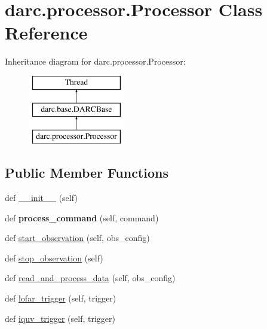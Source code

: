 \hypertarget{classdarc_1_1processor_1_1_processor}{}\section{darc.\+processor.\+Processor Class Reference}
\label{classdarc_1_1processor_1_1_processor}
Inheritance diagram for darc.\+processor.\+Processor\+:\begin{figure}[H]
\begin{center}
\leavevmode
\includegraphics[height=3.000000cm]{classdarc_1_1processor_1_1_processor}
\end{center}
\end{figure}
\subsection*{Public Member Functions}
\begin{DoxyCompactItemize}
\item 
def \mbox{\hyperlink{classdarc_1_1processor_1_1_processor_a82610338505fd26f2489149ed62ca282}{\+\_\+\+\_\+init\+\_\+\+\_\+}} (self)
\item 
\mbox{\label{classdarc_1_1processor_1_1_processor_a89f2c721c75b497f0fe68f697c7ffa6d}} 
def {\bfseries process\+\_\+command} (self, command)
\item 
def \mbox{\hyperlink{classdarc_1_1processor_1_1_processor_a7428244f0d8b3676db245655a802b86c}{start\+\_\+observation}} (self, obs\+\_\+config)
\item 
def \mbox{\hyperlink{classdarc_1_1processor_1_1_processor_a52192a97b32019ab29c2c1baf1599d2c}{stop\+\_\+observation}} (self)
\item 
def \mbox{\hyperlink{classdarc_1_1processor_1_1_processor_a84051f81c507812514c272109dd96191}{read\+\_\+and\+\_\+process\+\_\+data}} (self, obs\+\_\+config)
\item 
def \mbox{\hyperlink{classdarc_1_1processor_1_1_processor_ac131c76f45db46cf716097ea232c7401}{lofar\+\_\+trigger}} (self, trigger)
\item 
def \mbox{\hyperlink{classdarc_1_1processor_1_1_processor_ad24fbca252f0ca5d8da55a10fe33c35b}{iquv\+\_\+trigger}} (self, trigger)
\end{DoxyCompactItemize}
